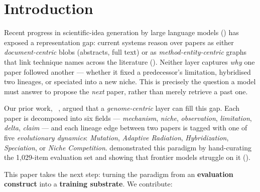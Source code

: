 \section{Introduction}
\label{sec:intro}

Recent progress in scientific-idea generation by large language models
() has exposed a
representation gap: current systems reason over papers as either
\emph{document-centric} blobs (abstracts, full text) or as
\emph{method-entity-centric} graphs that link technique names across the
literature (). Neither layer captures \emph{why} one
paper followed another --- whether it fixed a predecessor's limitation,
hybridised two lineages, or speciated into a new niche. This is precisely the
question a model must answer to propose the \emph{next} paper, rather than
merely retrieve a past one.

Our prior work, \ideaevolving~\citep{ideaevolving2025}, argued that a
\emph{genome-centric} layer can fill this gap. Each paper is decomposed into
six fields --- \emph{mechanism}, \emph{niche}, \emph{observation},
\emph{limitation}, \emph{delta}, \emph{claim} --- and each lineage edge
between two papers is tagged with one of five \emph{evolutionary dynamics}:
\textit{Mutation}, \textit{Adaptive Radiation}, \textit{Hybridization},
\textit{Speciation}, or \textit{Niche Competition}. \ideaevolving{}
demonstrated this paradigm by hand-curating the 1{,}029-item \geneexam{}
evaluation set and showing that frontier models struggle on it
().

This paper takes the next step: turning the paradigm from an
\textbf{evaluation construct} into a \textbf{training substrate}. We
contribute:

